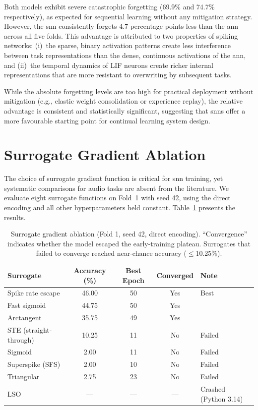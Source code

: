 Both models exhibit severe catastrophic forgetting (69.9\% and 74.7\% respectively), as expected for sequential learning without any mitigation strategy. However, the \gls{snn} consistently forgets 4.7 percentage points less than the \gls{ann} across all five folds. This advantage is attributed to two properties of spiking networks: (i)~the sparse, binary activation patterns create less interference between task representations than the dense, continuous activations of the \gls{ann}, and (ii)~the temporal dynamics of LIF neurons create richer internal representations that are more resistant to overwriting by subsequent tasks.

While the absolute forgetting levels are too high for practical deployment without mitigation (e.g., elastic weight consolidation or experience replay), the relative advantage is consistent and statistically significant, suggesting that \glspl{snn} offer a more favourable starting point for continual learning system design.

\section{Surrogate Gradient Ablation}
\label{sec:surrogate-results}

The choice of surrogate gradient function is critical for \gls{snn} training, yet systematic comparisons for audio tasks are absent from the literature. We evaluate eight surrogate functions on Fold~1 with seed 42, using the direct encoding and all other hyperparameters held constant. Table~\ref{tab:surrogate} presents the results.

\begin{table}[t]
\centering
\caption{Surrogate gradient ablation (Fold 1, seed 42, direct encoding). ``Convergence'' indicates whether the model escaped the early-training plateau. Surrogates that failed to converge reached near-chance accuracy ($\leq$10.25\%).}
\label{tab:surrogate}
\small
\begin{tabular}{@{}lcccl@{}}
\toprule
\textbf{Surrogate} & \textbf{Accuracy (\%)} & \textbf{Best Epoch} & \textbf{Converged} & \textbf{Note} \\
\midrule
Spike rate escape  & 46.00 & 50 & Yes & Best \\
Fast sigmoid       & 44.75 & 50 & Yes & \\
Arctangent         & 35.75 & 49 & Yes & \\
\midrule
STE (straight-through) & 10.25 & 11 & No & Failed \\
Sigmoid            &  2.00 & 11 & No & Failed \\
Superspike (SFS)   &  2.00 & 10 & No & Failed \\
Triangular         &  2.75 & 23 & No & Failed \\
\midrule
LSO                & --- & --- & --- & Crashed (Python 3.14) \\
\bottomrule
\end{tabular}
\end{table}

